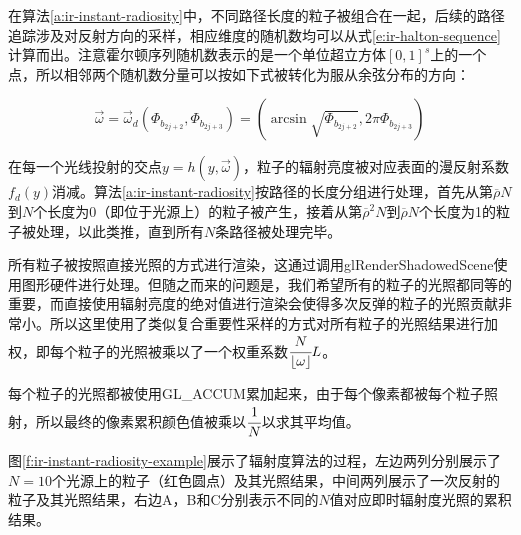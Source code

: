 在算法\ref{a:ir-instant-radiosity}中，不同路径长度的粒子被组合在一起，后续的路径追踪涉及对反射方向的采样，相应维度的随机数均可以从式\ref{e:ir-halton-sequence}计算而出。注意霍尔顿序列随机数表示的是一个单位超立方体$[0,1]^{s}$上的一个点，所以相邻两个随机数分量可以按如下式被转化为服从余弦分布的方向：

\begin{equation}
	\vec{\omega}=\vec{\omega}_d(\Phi_{b_{2j+2}},\Phi_{b_{2j+3}})=(\arcsin\sqrt{\Phi_{b_{2j+2}}},2\pi \Phi_{b_{2j+3}})
\end{equation}

在每一个光线投射的交点$y=h(y,\vec{\omega})$，粒子的辐射亮度被对应表面的漫反射系数$f_d(y)$消减。算法\ref{a:ir-instant-radiosity}按路径的长度分组进行处理，首先从第$\overline{\rho}N$到$N$个长度为0（即位于光源上）的粒子被产生，接着从第$\overline{\rho}^{2}N$到$\overline{\rho}N$个长度为1的粒子被处理，以此类推，直到所有$N$条路径被处理完毕。

所有粒子被按照直接光照的方式进行渲染，这通过调用glRenderShadowedScene使用图形硬件进行处理。但随之而来的问题是，我们希望所有的粒子的光照都同等的重要，而直接使用辐射亮度的绝对值进行渲染会使得多次反弹的粒子的光照贡献非常小。所以这里使用了类似复合重要性采样的方式对所有粒子的光照结果进行加权，即每个粒子的光照被乘以了一个权重系数$ \cfrac{N}{\lfloor\omega\rfloor}L$。

每个粒子的光照都被使用GL\_ACCUM累加起来，由于每个像素都被每个粒子照射，所以最终的像素累积颜色值被乘以$ \cfrac{1}{N}$以求其平均值。

图\ref{f:ir-instant-radiosity-example}展示了辐射度算法的过程，左边两列分别展示了$N=10$个光源上的粒子（红色圆点）及其光照结果，中间两列展示了一次反射的粒子及其光照结果，右边A，B和C分别表示不同的$N$值对应即时辐射度光照的累积结果。


